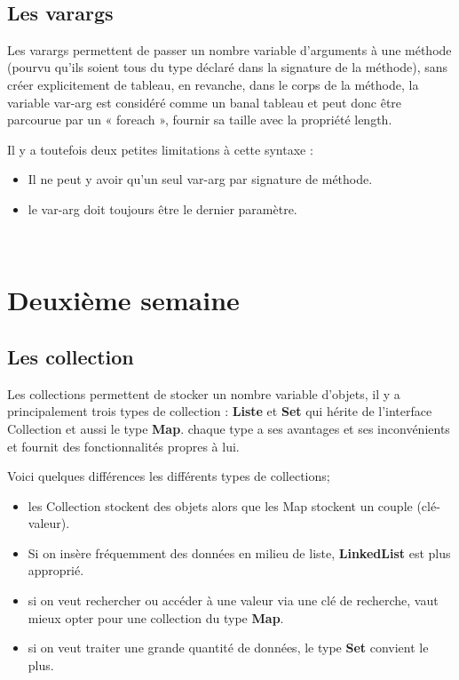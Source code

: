 \documentclass[12pt]{report}
\begin{document}
~\\
\subsection{Les varargs}
Les varargs permettent de passer un nombre variable d’arguments à une méthode (pourvu qu’ils soient tous du type déclaré dans la signature de la méthode), sans créer explicitement de tableau, en revanche, dans le corps de la méthode, la variable var-arg est considéré comme un banal tableau et peut donc être parcourue par un « foreach », fournir sa taille avec la propriété length.\newline

Il y a toutefois deux petites limitations à cette syntaxe :

\begin{itemize} 
\item Il ne peut y avoir qu’un seul var-arg par signature de méthode.
\item le var-arg doit toujours être le dernier paramètre.
\end{itemize}

~\\
\section{Deuxième semaine}

\subsection{Les collection}
Les collections permettent de stocker un nombre variable d'objets, il y a principalement trois types de collection : \textbf{Liste} et \textbf{Set} qui hérite de l'interface Collection et aussi le type \textbf{Map}. chaque type a ses avantages et ses inconvénients et fournit des fonctionnalités propres à lui.\newline

Voici quelques différences les différents types de collections;
\begin{itemize}
\item les Collection stockent des objets alors que les Map stockent un couple (clé-valeur).
\item Si on insère fréquemment des données en milieu de liste, \textbf{LinkedList} est plus approprié.
\item si on veut rechercher ou accéder à une valeur via une clé de recherche, vaut mieux opter pour une collection du type \textbf{Map}.
\item si on veut traiter une grande quantité de données, le type \textbf{Set} convient le plus.
\end{itemize}
\end{document}
